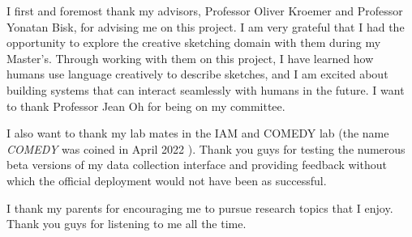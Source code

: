 I first and foremost thank my advisors, Professor Oliver Kroemer and Professor Yonatan Bisk, for advising me on this project. I am very grateful that I had the opportunity to explore the creative sketching domain with them during my Master's. 
Through working with them on this project, I have learned how humans use language creatively to describe sketches, and I am excited about building systems that can interact seamlessly with humans in the future. I want to thank Professor Jean Oh for being on my committee. 

I also want to thank my lab mates in the IAM and COMEDY lab (the name \textit{COMEDY} was coined in April 2022 ). Thank you guys for testing the numerous beta versions of my data collection interface and providing feedback without which the official deployment would not have been as successful. 

I thank my parents for encouraging me to pursue research topics that I enjoy. Thank you guys for listening to me all the time.
